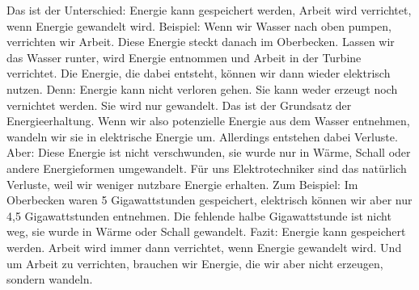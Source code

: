 \begin{frame}
{		Das ist der Unterschied:
		Energie kann gespeichert werden, Arbeit wird verrichtet, wenn Energie gewandelt wird.
		Beispiel:
		Wenn wir Wasser nach oben pumpen, verrichten wir Arbeit. Diese Energie steckt danach im Oberbecken.
		Lassen wir das Wasser runter, wird Energie entnommen und Arbeit in der Turbine verrichtet.
		Die Energie, die dabei entsteht, können wir dann wieder elektrisch nutzen.
		Denn: Energie kann nicht verloren gehen. Sie kann weder erzeugt noch vernichtet werden.
		Sie wird nur gewandelt. Das ist der Grundsatz der Energieerhaltung.
		Wenn wir also potenzielle Energie aus dem Wasser entnehmen, wandeln wir sie in elektrische Energie um.
		Allerdings entstehen dabei Verluste. 
		Aber: Diese Energie ist nicht verschwunden, sie wurde nur in Wärme, Schall oder andere Energieformen umgewandelt.
		Für uns Elektrotechniker sind das natürlich Verluste, weil wir weniger nutzbare Energie erhalten.
		Zum Beispiel:
		Im Oberbecken waren 5 Gigawattstunden gespeichert, elektrisch können wir aber nur 4,5 Gigawattstunden entnehmen.
		Die fehlende halbe Gigawattstunde ist nicht weg, sie wurde in Wärme oder Schall gewandelt.
		Fazit:
		Energie kann gespeichert werden.
		Arbeit wird immer dann verrichtet, wenn Energie gewandelt wird.
		Und um Arbeit zu verrichten, brauchen wir Energie, die wir aber nicht erzeugen, sondern wandeln.}
	
\end{frame}

